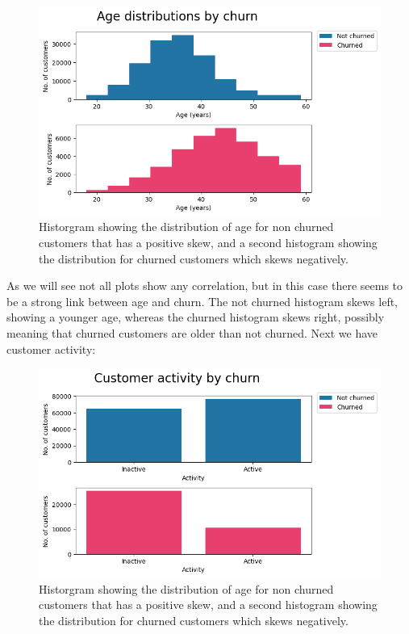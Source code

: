 \documentclass[]{article}
\begin{document}
\begin{figure}[h!]
	\centering
	\includegraphics[scale=0.4]{age_by_churn}
	\caption{Historgram showing the distribution of age for non churned customers that has a positive skew, and a second histogram showing the distribution for churned customers which skews negatively. }
\end{figure}

As we will see not all plots show any correlation, but in this case there seems to be a strong link between age and churn. The not churned histogram skews left, showing a younger age, whereas the churned histogram skews right, possibly meaning that churned customers are older than not churned. Next we have customer activity:

\clearpage

\begin{figure}[h!]
	\centering
	\includegraphics[scale=0.5]{activity_by_churn}
	\caption{Historgram showing the distribution of age for non churned customers that has a positive skew, and a second histogram showing the distribution for churned customers which skews negatively. }
\end{figure}
\end{document}
